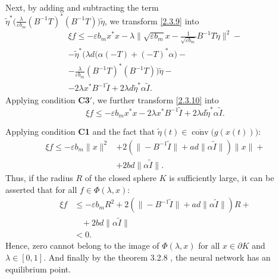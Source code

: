 \documentclass[journal]{IEEEtran}
\theoremstyle{myplain}
\begin{document}
\begin{IEEEproof}
\begin{equation}
\begin{aligned}
\end{aligned}
\end{equation}
Next, by adding and subtracting the term \\$\widetilde{\eta}^{*}\big(\frac{\lambda}{\varepsilon b_m}(B^{-1}T)^{*}(B^{-1}T)\big)\widetilde{\eta}$, we transform \eqref{2.3.9} into
\begin{multline}\label{2.3.10}
\xi f \leqslant  -\varepsilon b_m x^{*}x -\lambda\bigg\|\sqrt{\varepsilon b_m} x - \frac{1}{\sqrt{\varepsilon b_m}} B^{-1}T \widetilde{\eta} \bigg\|^2-\\
- \widetilde{\eta}^{*}\bigg( \lambda d \big(\alpha(-T)+(-T)^{*}\alpha\big) - \\
-\frac{\lambda}{\varepsilon b_m}(B^{-1}T)^{*}(B^{-1}T)\bigg) \widetilde{\eta} - \\
-2 \lambda x^{*} B^{-1} \widetilde I + 2\lambda d \widetilde\eta^{*} \alpha \widetilde I.
\end{multline}
Applying condition \textbf{C3$'$}, we further transform \eqref{2.3.10} into
\begin{equation*}\label{2.3.11}
\xi f \leqslant -\varepsilon b_m x^{*} x - 2 \lambda x^{*} B^{-1} \widetilde{I} + 2 \lambda d \widetilde{\eta}^{*} \alpha  \widetilde{I}.
\end{equation*}

Applying condition \textbf{C1} and the fact that $\widetilde\eta(t) \in \overline{\operatorname{conv}}\big(g(x(t))\big)$:
\begin{equation*}\label{2.3.12}
\begin{aligned}
    \xi f   \leqslant -\varepsilon b_m\|x\|^2&+2\left(\|-B^{-1} \widetilde{I}\| + a d  \|\alpha \widetilde{I}\|\right)\|x\|+ \\ 
    &+2 bd  \|\alpha \widetilde{I}\|.   
\end{aligned} 
\end{equation*}
Thus, if the radius $R$ of the closed sphere $K$ is sufficiently large, it can be asserted that for all $f\in \varPhi(\lambda,x)$:
\begin{equation*}\label{2.3.13}
\begin{aligned}
\xi f  &\leqslant -\varepsilon b_m R^2+2\left(\|-B^{-1} \widetilde{I}\| + a d  \|\alpha \widetilde{I}\|\right)R+\\&~~~~+2 bd  \|\alpha \widetilde{I}\|\\&<0 .     
\end{aligned}
\end{equation*}
Hence, zero cannot belong to the image of $\varPhi(\lambda, x)$ for all $x \in \partial K$ and $\lambda \in [0,1]$. And finally by the theorem 3.2.8 \cite[p. 90]{p3}, the neural network has an equilibrium point.
\end{IEEEproof}
\end{document}
